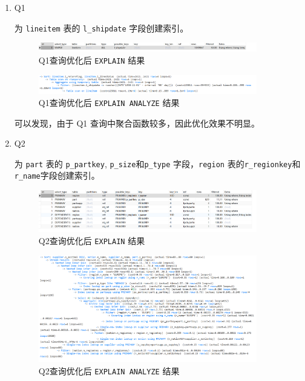 \documentclass{article}
\renewcommand\tt{\texttt}
\begin{document}
\begin{enumerate}
  \item Q1

为 \tt{lineitem} 表的 \tt{l\_shipdate} 字段创建索引。

\begin{figure}[H]
\centering
\includegraphics[width=0.9\textwidth]{img/45.png}
\caption{Q1查询优化后 \tt{EXPLAIN} 结果}
\end{figure}

\begin{figure}[H]
\centering
\includegraphics[width=0.9\textwidth]{img/46.png}
\caption{Q1查询优化后 \tt{EXPLAIN ANALYZE} 结果}
\end{figure}

可以发现，由于 Q1 查询中聚合函数较多，因此优化效果不明显。

  \item Q2
  
为 \tt{part} 表的 \tt{p\_partkey}, \tt{p\_size}和\tt{p\_type} 字段，\tt{region} 表的\tt{r\_regionkey}和\tt{r\_name}字段创建索引。

\begin{figure}[H]
\centering
\includegraphics[width=0.9\textwidth]{img/47.png}
\caption{Q2查询优化后 \tt{EXPLAIN} 结果}
\end{figure}

\begin{figure}[H]
\centering
\includegraphics[width=0.9\textwidth]{img/48.png}
\caption{Q2查询优化后 \tt{EXPLAIN ANALYZE} 结果}
\end{figure}


\end{enumerate}
\end{document}
